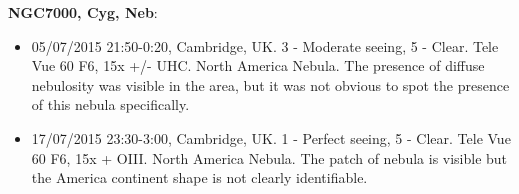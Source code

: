 {\bf NGC7000, Cyg, Neb}:
\begin{itemize}
\item 05/07/2015 21:50-0:20, Cambridge, UK. 3 - Moderate seeing, 5 - Clear. Tele Vue 60 F6, 15x +/- UHC. North America Nebula. The presence of diffuse nebulosity was visible in the area, but it was not obvious to spot the presence of this nebula specifically. 
\item 17/07/2015 23:30-3:00, Cambridge, UK. 1 - Perfect seeing, 5 - Clear. Tele Vue 60 F6, 15x + OIII. North America Nebula. The patch of nebula is visible but the America continent shape is not clearly identifiable. 
\end{itemize}
